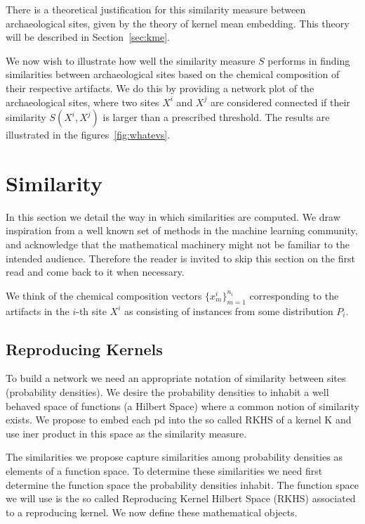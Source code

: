 There is a theoretical justification for this similarity measure between archaeological sites, given by the theory of kernel mean embedding. This theory will be described in Section~\ref{sec:kme}.

We now wish to illustrate how well the similarity measure $S$ performs in finding similarities between archaeological sites based on the chemical composition of their respective artifacts. We do this by providing a network plot of the archaeological sites, where two sites $X^i$ and $X^j$ are considered connected if their similarity $S(X^i,X^j)$ is larger than a prescribed threshold. The results are illustrated in the figures~\ref{fig:whatevs}.

\section{Similarity}

\label{sec:similarity}

In this section we detail the way in which similarities are computed. We draw inspiration from a well known set of methods in the machine learning community, and acknowledge that the mathematical machinery might not be familiar to the intended audience. Therefore the reader is invited to skip this section on the first read and come back to it when necessary.

We think of the chemical composition vectors $\{x^i_m\}_{m=1}^{n_i}$ corresponding to the artifacts in the $i$-th site $X^i$ as consisting of instances from some distribution $P_i$.

\subsection{Reproducing Kernels}

\label{kernels}

To build a network we need an appropriate notation of similarity between sites (probability densities). We desire the probability densities to inhabit a well behaved space of functions (a Hilbert Space) where a common notion of similarity exists. We propose to embed each pd into the so called RKHS of a kernel K and use iner product in this space as the similarity measure.

The similarities we propose capture similarities among probability densities as elements of a function space. To determine these similarities we need first determine the function space the probability densities inhabit. The function space we will use is the so called Reproducing Kernel Hilbert Space (RKHS) associated to a reproducing kernel. We now define these mathematical objects.

